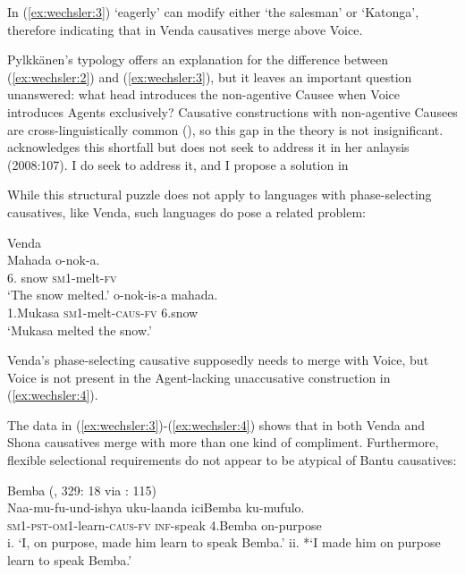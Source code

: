 \documentclass[output=paper,modfonts,nonflat,colorlinks,citecolor=brown]{langsci/langscibook}
\begin{document}
In (\ref{ex:wechsler:3}) ‘eagerly’ can modify either ‘the salesman’ or ‘Katonga’, therefore indicating that in Venda causatives merge above Voice.  



Pylkkänen’s typology offers an explanation for the difference between (\ref{ex:wechsler:2}) and (\ref{ex:wechsler:3}), but it leaves an important question unanswered: what head introduces the non-agentive Causee when Voice introduces Agents exclusively? Causative constructions with non-agentive Causees are cross-linguistically common (\citealt{Kulikov2001,Kittilä2013}), so this gap in the theory is not insignificant. \citeauthor{Pylkkänen2008} acknowledges this shortfall but does not seek to address it in her anlaysis (2008:107). I do seek to address it, and I propose a solution in   



While this structural puzzle does not apply to languages with phase-selecting causatives, like Venda, such languages do pose a related problem:


\ea\label{ex:wechsler:4}
Venda \citet[2]{Pylkkänen2008}\\
\ea
\gll Mahada  {{o-nok-a}}. \\
6. snow  {\textsc{sm1}{}-melt-\textsc{fv} }\\
\glt `The snow melted.'
\ex 
{}  {{o-nok-is-a} } {mahada}.\\
 {1.Mukasa}   {\textsc{sm1}{}-melt-\textsc{caus}{}-\textsc{fv} }  6.snow\\
\glt `Mukasa melted the snow.'
\z
\z

Venda’s phase-selecting causative supposedly needs to merge with Voice, but Voice is not present in the Agent-lacking unaccusative construction in (\ref{ex:wechsler:4}).

The data in (\ref{ex:wechsler:3})-(\ref{ex:wechsler:4}) shows that in both Venda and Shona causatives merge with more than one kind of compliment. Furthermore, flexible selectional requirements do not appear to be atypical of Bantu causatives: 

\ea\label{ex:wechsler:5}
{Bemba (\citealt{Givón1976}, 329: 18 via \citealt{Pylkkänen2008}: 115)}\\
{Naa-mu-fu-und-ishya} {uku-laanda} {iciBemba} {ku-mufulo}.\\
\textsc{sm}1\textsc{{}-pst-om1}{}-learn-\textsc{caus-fv}  \textsc{inf-}speak  4.Bemba  on-purpose\\
\glt i. ‘I, on purpose, made him learn to speak Bemba.’
\glt ii. *‘I made him on purpose learn to speak Bemba.'
\z
\end{document}
